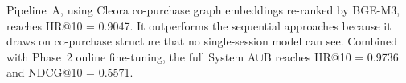 Pipeline~A, using Cleora co-purchase graph embeddings re-ranked by BGE-M3, reaches HR@10 = 0.9047. It outperforms the sequential approaches because it draws on co-purchase structure that no single-session model can see. Combined with Phase~2 online fine-tuning, the full System A$\cup$B reaches HR@10 = 0.9736 and NDCG@10 = 0.5571.



